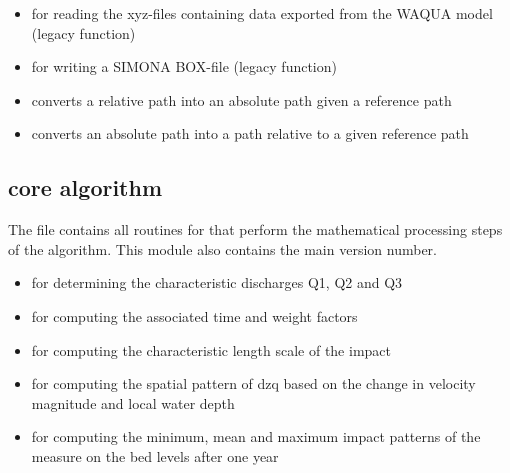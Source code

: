 \begin{itemize}
\item {} for reading the xyz-files containing data exported from the WAQUA model (legacy function)
\item {} for writing a SIMONA BOX-file (legacy function)

\item {} converts a relative path into an absolute path given a reference path
\item {} converts an absolute path into a path relative to a given reference path
\end{itemize}

\subsection{core algorithm }

The  file contains all routines for that perform the mathematical processing steps of the algorithm.
This module also contains the main version number.

\begin{itemize}
\item {} for determining the characteristic discharges Q1, Q2 and Q3
\item {} for computing the associated time and weight factors
\item {} for computing the characteristic length scale of the impact
\item {} for computing the spatial pattern of dzq based on the change in velocity magnitude and local water depth
\item {} for computing the minimum, mean and maximum impact patterns of the measure on the bed levels after one year
\end{itemize}
